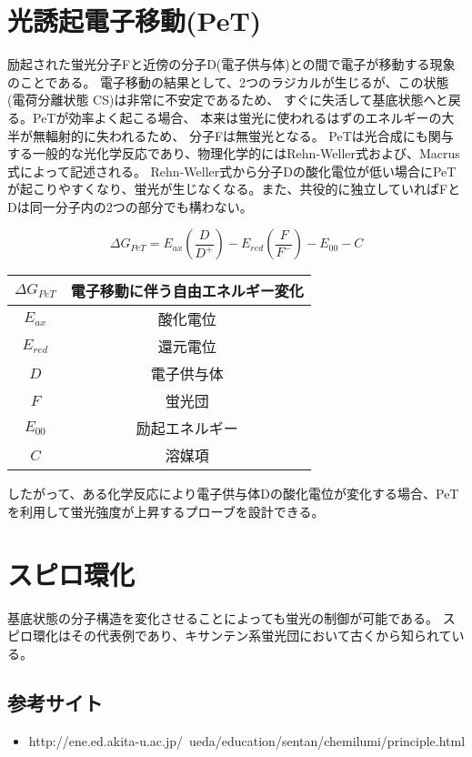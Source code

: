 \documentclass[a4paper,papersize,dvipdfmx]{jsarticle}
\begin{document}
\section{光誘起電子移動(PeT)}
励起された蛍光分子Fと近傍の分子D(電子供与体)との間で電子が移動する現象のことである。
電子移動の結果として、2つのラジカルが生じるが、この状態(電荷分離状態 CS)は非常に不安定であるため、
すぐに失活して基底状態へと戻る。PeTが効率よく起こる場合、
本来は蛍光に使われるはずのエネルギーの大半が無輻射的に失われるため、
分子Fは無蛍光となる。
PeTは光合成にも関与する一般的な光化学反応であり、物理化学的にはRehn-Weller式および、Macrus式によって記述される。
Rehn-Weller式から分子Dの酸化電位が低い場合にPeTが起こりやすくなり、蛍光が生じなくなる。また、共役的に独立していればFとDは同一分子内の2つの部分でも構わない。

\begin{equation}
\Delta G_{PeT} = E_{ax} ( \frac{D}{D^+} )-E_{red}( \frac{F}{F^-} )-E_{00}-C \tag{Rehn-Weller式}
\end{equation}

\begin{table}[H]
\centering
\begin{tabular}{|c|c|}
\hline
$\Delta G_{PeT}$ & 電子移動に伴う自由エネルギー変化 \\ \hline
$E_{ax}$         & 酸化電位             \\ \hline
$E_{red}$        & 還元電位             \\ \hline
$D$              & 電子供与体            \\ \hline
$F$              & 蛍光団              \\ \hline
$E_{00}$         & 励起エネルギー          \\ \hline
$C$              & 溶媒項              \\ \hline
\end{tabular}
\end{table}

したがって、ある化学反応により電子供与体Dの酸化電位が変化する場合、PeTを利用して蛍光強度が上昇するプローブを設計できる。

\section{スピロ環化}
基底状態の分子構造を変化させることによっても蛍光の制御が可能である。
スピロ環化はその代表例であり、キサンテン系蛍光団において古くから知られている。

\subsection{参考サイト}
\begin{itemize}
\item http://ene.ed.akita-u.ac.jp/~ueda/education/sentan/chemilumi/principle.html
\end{itemize}
\end{document}
